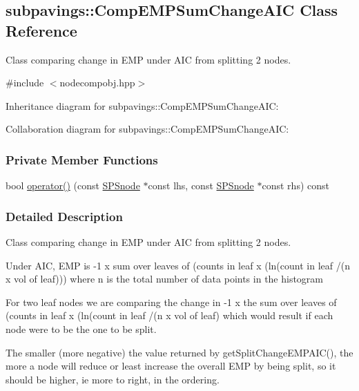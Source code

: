 \hypertarget{classsubpavings_1_1CompEMPSumChangeAIC}{\subsection{subpavings\-:\-:\-Comp\-E\-M\-P\-Sum\-Change\-A\-I\-C \-Class \-Reference}
\label{classsubpavings_1_1CompEMPSumChangeAIC}
}


\-Class comparing change in \-E\-M\-P under \-A\-I\-C from splitting 2 nodes.  




{\ttfamily \#include $<$nodecompobj.\-hpp$>$}



\-Inheritance diagram for subpavings\-:\-:\-Comp\-E\-M\-P\-Sum\-Change\-A\-I\-C\-:


\-Collaboration diagram for subpavings\-:\-:\-Comp\-E\-M\-P\-Sum\-Change\-A\-I\-C\-:
\subsubsection*{\-Private \-Member \-Functions}
\begin{DoxyCompactItemize}
\item 
bool \hyperlink{classsubpavings_1_1CompEMPSumChangeAIC_aeea99de2697cb8c31c4a6e31556f8356}{operator()} (const \hyperlink{classsubpavings_1_1SPSnode}{\-S\-P\-Snode} $\ast$const lhs, const \hyperlink{classsubpavings_1_1SPSnode}{\-S\-P\-Snode} $\ast$const rhs) const 
\end{DoxyCompactItemize}


\subsubsection{\-Detailed \-Description}
\-Class comparing change in \-E\-M\-P under \-A\-I\-C from splitting 2 nodes. 

\-Under \-A\-I\-C, \-E\-M\-P is -\/1 x sum over leaves of (counts in leaf x (ln(count in leaf /(n x vol of leaf))) where n is the total number of data points in the histogram

\-For two leaf nodes we are comparing the change in -\/1 x the sum over leaves of (counts in leaf x (ln(count in leaf /(n x vol of leaf) which would result if each node were to be the one to be split.

\-The smaller (more negative) the value returned by get\-Split\-Change\-E\-M\-P\-A\-I\-C(), the more a node will reduce or least increase the overall \-E\-M\-P by being split, so it should be higher, ie more to right, in the ordering. 

